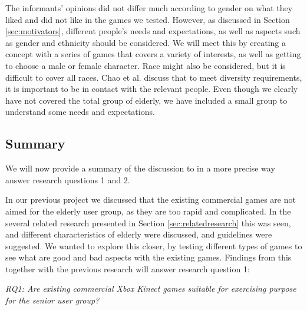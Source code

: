 The informants' opinions did not differ much according to gender on what they liked and did not like in the games we tested. However, as discussed in Section \ref{sec:motivators}, different people's needs and expectations, as well as aspects such as gender and ethnicity should be considered. We will meet this by creating a concept with a series of games that covers a variety of interests, as well as getting to choose a male or female character. Race might also be considered, but it is difficult to cover all races. Chao et al. \cite{chao} discuss that to meet diversity requirements, it is important to be in contact with the relevant people. Even though we clearly have not covered the total group of elderly, we have included a small group to understand some needs and expectations.

\subsection{Summary}
We will now provide a summary of the discussion to in a more precise way answer research questions 1 and 2. 

In our previous project \cite{project} we discussed that the existing commercial games are not aimed for the elderly user group, as they are too rapid and complicated. In the several related research presented in Section \ref{sec:relatedresearch} this was seen, and different characteristics of elderly were discussed, and guidelines were suggested. We wanted to explore this closer, by testing different types of games to see what are good and bad aspects with the existing games. Findings from this together with the previous research will answer research question 1:

\emph{RQ1: Are existing commercial Xbox Kinect games suitable for exercising purpose for the senior user group?}

